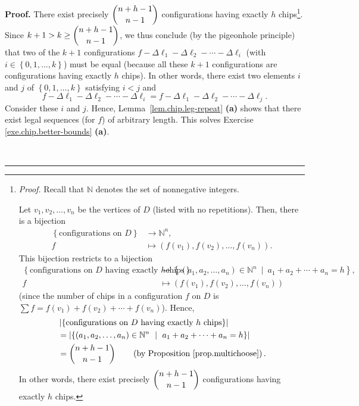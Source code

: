 \documentclass[numbers=enddot,12pt,final,onecolumn,notitlepage]{scrartcl}%
\theoremstyle{definition}
\newenvironment{proof}[1][Proof]{\noindent\textbf{#1.} }{\ \rule{0.5em}{0.5em}}
\let\sumnonlimits\sum
\renewcommand{\sum}{\sumnonlimits\limits}
\begin{document}
\begin{proof}
There exist precisely $\dbinom{n+h-1}{n-1}$ configurations having exactly $h$
chips\footnote{\textit{Proof.} Recall that $\mathbb{N}$ denotes the set of
nonnegative integers.
\par
Let $v_{1},v_{2},\ldots,v_{n}$ be the vertices of $D$ (listed with no
repetitions). Then, there is a bijection%
\begin{align*}
\left\{  \text{configurations on }D\right\}   &  \rightarrow\mathbb{N}^{n},\\
f  &  \mapsto\left(  f\left(  v_{1}\right)  ,f\left(  v_{2}\right)
,\ldots,f\left(  v_{n}\right)  \right)  .
\end{align*}
This bijection restricts to a bijection%
\begin{align*}
\left\{  \text{configurations on }D\text{ having exactly }h\text{
chips}\right\}   &  \rightarrow\left\{  \left(  a_{1},a_{2},\ldots
,a_{n}\right)  \in\mathbb{N}^{n}\ \mid\ a_{1}+a_{2}+\cdots+a_{n}=h\right\}
,\\
f  &  \mapsto\left(  f\left(  v_{1}\right)  ,f\left(  v_{2}\right)
,\ldots,f\left(  v_{n}\right)  \right)
\end{align*}
(since the number of chips in a configuration $f$ on $D$ is $\sum f=f\left(
v_{1}\right)  +f\left(  v_{2}\right)  +\cdots+f\left(  v_{n}\right)  $).
Hence,%
\begin{align*}
&  \left\vert \left\{  \text{configurations on }D\text{ having exactly
}h\text{ chips}\right\}  \right\vert \\
&  =\left\vert \left\{  \left(  a_{1},a_{2},\ldots,a_{n}\right)  \in
\mathbb{N}^{n}\ \mid\ a_{1}+a_{2}+\cdots+a_{n}=h\right\}  \right\vert \\
&  =\dbinom{n+h-1}{n-1}\qquad \left(  \text{by Proposition
\ref{prop.multichoose}}\right)  .
\end{align*}
In other words, there exist precisely $\dbinom{n+h-1}{n-1}$ configurations
having exactly $h$ chips.}. Since $k+1>k\geq\dbinom{n+h-1}{n-1}$, we thus
conclude (by the pigeonhole principle) that two of the $k+1$ configurations
$f-\Delta\ell_{1}-\Delta\ell_{2}-\cdots-\Delta\ell_{i}$ (with $i\in\left\{
0,1,\ldots,k\right\}  $) must be equal (because all these $k+1$ configurations
are configurations having exactly $h$ chips). In other words, there exist two
elements $i$ and $j$ of $\left\{  0,1,\ldots,k\right\}  $ satisfying $i<j$ and%
\begin{equation}
f-\Delta\ell_{1}-\Delta\ell_{2}-\cdots-\Delta\ell_{i}=f-\Delta\ell_{1}%
-\Delta\ell_{2}-\cdots-\Delta\ell_{j}. \label{sol.chip.better-bounds.ivsj}%
\end{equation}
Consider these $i$ and $j$.
Hence, Lemma~\ref{lem.chip.leg-repeat} \textbf{(a)} shows that
there exist legal sequences (for $f$) of arbitrary length.
This solves Exercise \ref{exe.chip.better-bounds} \textbf{(a)}.


\end{proof}
\end{document}
